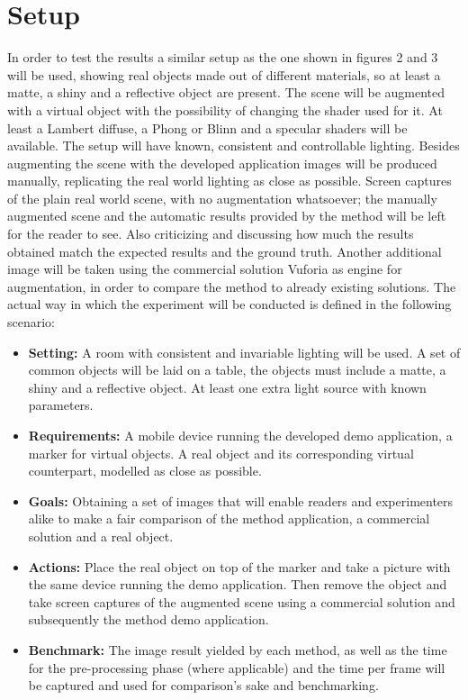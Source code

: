 \section{Setup}
In order to test the results a similar setup as the one shown in figures 2 and 3 will be used, showing real objects made out of different materials, so at least a matte, a shiny and a reflective object are present. The scene will be augmented with a virtual object with the possibility of changing the shader used for it. At least a Lambert diffuse, a Phong or Blinn and a specular shaders will be available. The setup will have known,  consistent and controllable lighting.\newline
Besides augmenting the scene with the developed application images will be produced manually, replicating the real world lighting as close as possible. Screen captures of the plain real world scene, with no augmentation whatsoever; the manually augmented scene and the automatic results provided by the method will be left for the reader to see. Also criticizing and discussing how much the results obtained match the expected results and the ground truth. Another additional image will be taken using the commercial solution Vuforia as engine for augmentation, in order to compare the method to already existing solutions.\newline
The actual way in which the experiment will be conducted is defined in the following scenario:
\begin{itemize}
    \item \textbf{Setting:} A room with consistent and invariable lighting will be used. A set of common objects will be laid on a table, the objects must include a matte, a shiny and a reflective object. At least one extra light source with known parameters.
    \item \textbf{Requirements:} A mobile device running the developed demo application, a marker for virtual objects. A real object and its corresponding virtual counterpart, modelled as close as possible. 
    \item \textbf{Goals:} Obtaining a set of images that will enable readers and experimenters alike to make a fair comparison of the method application, a commercial solution and a real object.
    \item \textbf{Actions:} Place the real object on top of the marker and take a picture with the same device running the demo application. Then remove the object and take screen captures of the augmented scene using a commercial solution and subsequently the method demo application.
     \item \textbf{Benchmark:} The image result yielded by each method, as well as the time for the pre-processing phase (where applicable) and the time per frame will be captured and used for comparison's sake and benchmarking.
\end{itemize}

